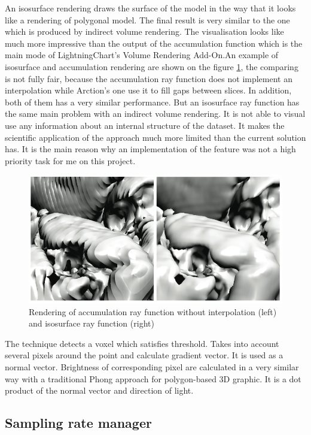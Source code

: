 \documentclass[twoside, english, 11pt]{report}
\begin{document}
An isosurface rendering draws the surface of the model in the way that it looks like a rendering of polygonal model. The final result is very similar to the one which is produced by indirect volume rendering. The visualisation looks like much more impressive than the output of the accumulation function which is the main mode of LightningChart's Volume Rendering Add-On.An example of isosurface and accumulation rendering are shown on the figure \ref{fig:iso}, the comparing is not fully fair, because the accumulation ray function does not implement an interpolation while Arction's one use it to fill gaps between slices. In addition, both of them has a very similar performance. But an isosurface ray function has the same main problem with an indirect volume rendering. It is not able to visual use any information about an internal structure of the dataset. It makes the scientific application of the approach much more limited than the current solution has. It is the main reason why an implementation of the feature was not a high priority task for me on this project.
\begin{figure}[H]
\centerline{\includegraphics[scale = 0.5]{img/iso}}
\caption{Rendering of accumulation ray function without interpolation (left) and isosurface ray function (right)\label{fig:iso}}
\end{figure}

The technique detects a voxel which satisfies threshold. Takes into account several pixels around the point and calculate gradient vector. It is used as a normal vector. Brightness of corresponding pixel are calculated in a very similar way with a traditional Phong approach for polygon-based 3D graphic. It is a dot product of the normal vector and direction of light.

\subsection{Sampling rate manager}
 
\end{document}
